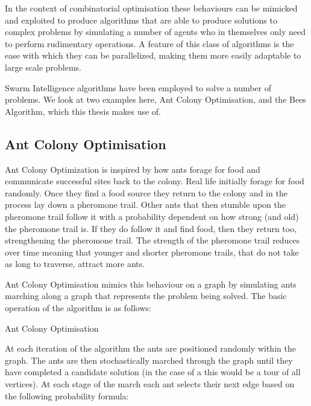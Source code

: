 In the context of combinatorial optimisation these behaviours can be mimicked and exploited to produce algorithms that are able to produce solutions to complex problems by simulating a number of agents who in themselves only need to perform rudimentary operations. A feature of this class of algorithms is the ease with which they can be parallelized, making them more easily adaptable to large scale problems.

Swarm Intelligence algorithms have been employed to solve a number of problems. We look at two examples here, Ant Colony Optimisation, and the Bees Algorithm, which this thesis makes use of.

\subsection{Ant Colony Optimisation}

Ant Colony Optimization is inspired by how ants forage for food and communicate successful sites back to the colony. Real life initially forage for food randomly. Once they find a food source they return to the colony and in the process lay down a pheromone trail. Other ants that then stumble upon the pheromone trail follow it with a probability dependent on how strong (and old) the pheromone trail is. If they do follow it and find food, then they return too, strengthening the pheromone trail. The strength of the pheromone trail reduces over time meaning that younger and shorter pheromone trails, that do not take as long to traverse, attract more ants.  


Ant Colony Optimisation mimics this behaviour on a graph by simulating ants marching along a graph that represents the problem being solved. The basic operation of the algorithm is as follows: 

\begin{algorithm}
   \caption{Ant Colony Optimisation}
\end{algorithm}
 
At each iteration of the algorithm the ants are positioned randomly within the graph. The ants are then stochastically marched through the graph until they have completed a candidate solution (in the case of a \TSP this would be a tour of all vertices). At each stage of the march each ant selects their next edge based on the following probability formula:

